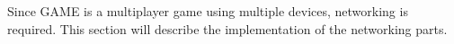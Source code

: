 Since GAME is a multiplayer game using multiple devices, networking is required. 
This section will describe the implementation of the networking parts.



